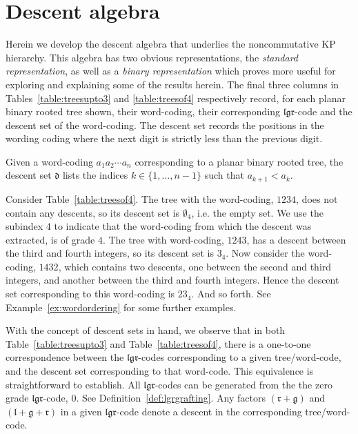 \documentclass[5p,twocolumn]{elsarticle}
\newcommand*{\el}{\mathfrak l}
\newcommand*{\gl}{\mathfrak g}
\newcommand*{\rl}{\mathfrak r}
\newcommand*{\df}{\mathfrak d}
\begin{document}
\section{Descent algebra}\label{sec:descent-alg}
Herein we develop the descent algebra that underlies the noncommutative KP hierarchy.
This algebra has two obvious representations, the \emph{standard representation}, as well as a \emph{binary representation} which proves more useful for exploring and explaining some of the results herein.  
The final three columns in Tables~\ref{table:treesupto3} and \ref{table:treesof4} respectively record, for each planar binary rooted tree shown,
their word-coding, their corresponding $\el\gl\rl$-code and the descent set of the word-coding.
The descent set records the positions in the wording coding where the next digit is strictly less than the previous digit.
%
\begin{definition}\label{def:descentset}
Given a word-coding $a_1a_2\cdots a_n$ corresponding to a planar binary rooted tree, the descent set $\df$ lists the indices $k\in\{1,\ldots,n-1\}$ such that $a_{k+1}<a_k$.  
\end{definition}
%
\begin{example}
  Consider Table~\ref{table:treesof4}. The tree with the word-coding, $1234$, does not contain any descents, so its descent set is $\emptyset_4$, i.e.\/ the empty set.
  We use the subindex $4$ to indicate that the word-coding from which the descent was extracted, is of grade $4$.
  The tree with word-coding, $1243$, has a descent between the third and fourth integers, so its descent set is $3_4$.
  Now consider the word-coding, $1432$, which contains two descents, one between the second and third integers, and another between the third and fourth integers.
  Hence the descent set corresponding to this word-coding is $23_4$. And so forth. See Example~\ref{ex:wordordering} for some further examples.
\end{example}
%
With the concept of descent sets in hand, we observe that in both Table~\ref{table:treesupto3} and Table~\ref{table:treesof4}, there is a one-to-one correspondence 
between the $\el\gl\rl$-codes corresponding to a given tree/word-code, and the descent set corresponding to that word-code.  
This equivalence is straightforward to establish. All $\el\gl\rl$-codes can be generated from the the zero grade $\el\gl\rl$-code, $\mathfrak 0$. See Definition~\ref{def:lgrgrafting}.
Any factors $(\rl+\gl)$ and $(\el+\gl+\rl)$ in a given $\el\gl\rl$-code denote a descent in the corresponding tree/word-code.
\end{document}
